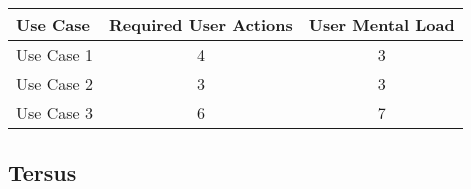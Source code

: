 
\begin{tabularx}{\textwidth}{Xcc}
\textbf{Use Case} & \textbf{Required User Actions} & \textbf{User Mental Load}\\
\hline
Use Case 1                          & 4 & 3 \\
Use Case 2                          & 3 & 3 \\
Use Case 3                          & 6 & 7
\end{tabularx}

\subsection*{Tersus}




